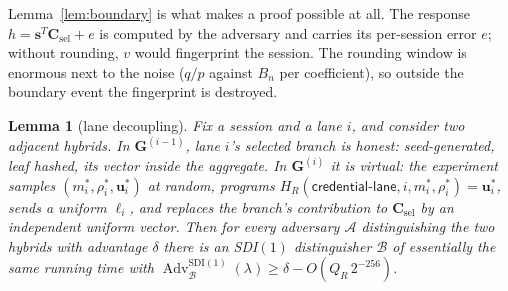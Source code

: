 \documentclass[11pt]{article}
\newcommand{\Adv}{\operatorname{Adv}}
\newcommand{\Gm}{\mathbf{G}}
\newtheorem{lemma}[theorem]{Lemma}
\begin{document}
Lemma~\ref{lem:boundary} is what makes a proof possible at all.  The
response $h=\mathbf s^{T}\mathbf C_{\mathrm{sel}}+e$ is computed by the
adversary and carries its per-session error $e$; without rounding, $v$ would
fingerprint the session.  The rounding window is enormous next to the noise
($q/p$ against $B_n$ per coefficient), so outside the boundary event the
fingerprint is destroyed.

\begin{lemma}[lane decoupling]
\label{lem:lane}
Fix a session and a lane $i$, and consider two adjacent hybrids.  In
$\Gm^{(i-1)}$, lane $i$'s selected branch is honest: seed-generated, leaf
hashed, its vector inside the aggregate.  In $\Gm^{(i)}$ it is
\emph{virtual}: the experiment samples
$(m_i^*,\rho_i^*,\mathbf u_i^*)$ at random, programs
$H_R(\mathsf{credential\mbox{-}lane},i,m_i^*,\rho_i^*)=\mathbf u_i^*$,
sends a uniform $\ell_i$, and replaces the branch's contribution to
$\mathbf C_{\mathrm{sel}}$ by an independent uniform vector.  Then for every
adversary $\mathcal A$ distinguishing the two hybrids with advantage
$\delta$ there is an SDI$(1)$ distinguisher $\mathcal B$ of essentially the
same running time with
$\Adv^{\mathrm{SDI}(1)}_{\mathcal B}(\lambda)
 \ge\delta-O(Q_R\,2^{-256})$.
\end{lemma}
\end{document}
